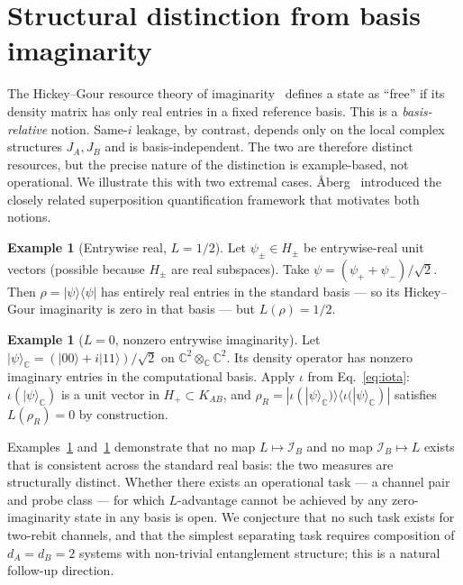 \documentclass[a4paper,onecolumn,noarxiv]{quantumarticle}
\theoremstyle{plain}
\theoremstyle{definition}
\newtheorem{example}[theorem]{Example}
\theoremstyle{remark}
\newcommand{\C}{\mathbb{C}}
\newcommand{\KAB}{K_{AB}}
\newcommand{\Hplus}{H_{+}}
\newcommand{\Lleak}{L}
\begin{document}
\section{Structural distinction from basis imaginarity}
\label{sec:imaginarity}

The Hickey--Gour resource theory of imaginarity~\cite{HickeyGour2018,Wu2021Imaginarity}
defines a state as ``free'' if its density matrix has only real entries in a fixed
reference basis. This is a \emph{basis-relative} notion. Same-$i$ leakage, by
contrast, depends only on the local complex structures $J_A,J_B$ and is
basis-independent. The two are therefore distinct resources, but the precise nature
of the distinction is example-based, not operational. We illustrate this with two
extremal cases. \AA berg~\cite{Aberg2006} introduced the closely related superposition
quantification framework that motivates both notions.

\begin{example}[Entrywise real, $\Lleak=1/2$]
\label{ex:realL}
Let $\psi_\pm\in H_\pm$ be entrywise-real unit vectors (possible because $H_\pm$ are
real subspaces). Take $\psi=(\psi_++\psi_-)/\sqrt{2}$. Then
$\rho=|\psi\rangle\langle\psi|$ has entirely real entries in the standard basis ---
so its Hickey--Gour imaginarity is zero in that basis --- but $\Lleak(\rho)=1/2$.
\end{example}

\begin{example}[$\Lleak=0$, nonzero entrywise imaginarity]
\label{ex:complexL0}
Let $|\psi\rangle_\C=(|00\rangle+i|11\rangle)/\sqrt{2}$ on $\C^2\otimes_\C\C^2$.
Its density operator has nonzero imaginary entries in the computational basis. Apply
$\iota$ from Eq.~\eqref{eq:iota}: $\iota(|\psi\rangle_\C)$ is a unit vector in
$\Hplus\subset\KAB$, and $\rho_R=|\iota(|\psi\rangle_\C)\rangle\langle\iota(|\psi\rangle_\C)|$
satisfies $\Lleak(\rho_R)=0$ by construction.
\end{example}

Examples~\ref{ex:realL} and~\ref{ex:complexL0} demonstrate that no map
$\Lleak\mapsto\mathcal{I}_B$ and no map $\mathcal{I}_B\mapsto\Lleak$ exists that is
consistent across the standard real basis: the two measures are structurally distinct.
Whether there exists an operational task --- a channel pair and probe class --- for
which $\Lleak$-advantage cannot be achieved by any zero-imaginarity state in any basis
is open. We conjecture that no such task exists for two-rebit channels, and that the
simplest separating task requires composition of $d_A=d_B=2$ systems with
non-trivial entanglement structure; this is a natural follow-up direction.
\end{document}
